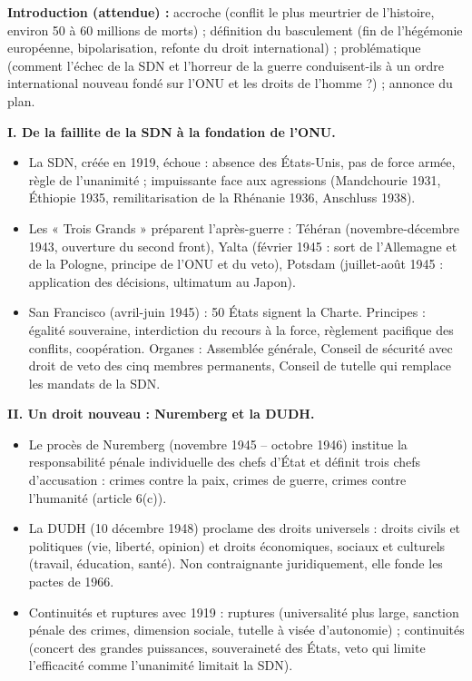 \documentclass[11pt]{article}
\begin{document}
\begin{corrige}
\textbf{Introduction (attendue) :} accroche (conflit le plus meurtrier de l'histoire, environ 50 à 60 millions de morts) ; définition du basculement (fin de l'hégémonie européenne, bipolarisation, refonte du droit international) ; problématique (comment l'échec de la SDN et l'horreur de la guerre conduisent-ils à un ordre international nouveau fondé sur l'ONU et les droits de l'homme ?) ; annonce du plan.

\textbf{I. De la faillite de la SDN à la fondation de l'ONU.}
\begin{itemize}
\item La SDN, créée en 1919, échoue : absence des États-Unis, pas de force armée, règle de l'unanimité ; impuissante face aux agressions (Mandchourie 1931, Éthiopie 1935, remilitarisation de la Rhénanie 1936, Anschluss 1938).
\item Les « Trois Grands » préparent l'après-guerre : Téhéran (novembre-décembre 1943, ouverture du second front), Yalta (février 1945 : sort de l'Allemagne et de la Pologne, principe de l'ONU et du veto), Potsdam (juillet-août 1945 : application des décisions, ultimatum au Japon).
\item San Francisco (avril-juin 1945) : 50 États signent la Charte. Principes : égalité souveraine, interdiction du recours à la force, règlement pacifique des conflits, coopération. Organes : Assemblée générale, Conseil de sécurité avec droit de veto des cinq membres permanents, Conseil de tutelle qui remplace les mandats de la SDN.
\end{itemize}

\textbf{II. Un droit nouveau : Nuremberg et la DUDH.}
\begin{itemize}
\item Le procès de Nuremberg (novembre 1945 -- octobre 1946) institue la responsabilité pénale individuelle des chefs d'État et définit trois chefs d'accusation : crimes contre la paix, crimes de guerre, crimes contre l'humanité (article 6(c)).
\item La DUDH (10 décembre 1948) proclame des droits universels : droits civils et politiques (vie, liberté, opinion) et droits économiques, sociaux et culturels (travail, éducation, santé). Non contraignante juridiquement, elle fonde les pactes de 1966.
\item Continuités et ruptures avec 1919 : ruptures (universalité plus large, sanction pénale des crimes, dimension sociale, tutelle à visée d'autonomie) ; continuités (concert des grandes puissances, souveraineté des États, veto qui limite l'efficacité comme l'unanimité limitait la SDN).
\end{itemize}


\end{corrige}
\end{document}
